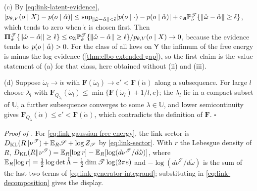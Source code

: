 (c) By \eqref{eq:link-latent-evidence},
$\lvert p_{\theta,V}(o\mid X)-p(o\mid\mathring\alpha)\rvert\leq\sup_{\lVert\mathring\omega-\mathring\alpha\rVert<\mathring\epsilon}\lvert p(o\mid\cdot)-p(o\mid\mathring\alpha)\rvert
+\mathrm c_{\mathfrak A}\mathbb P^{\mathscr T}_{\mathring\sigma}\{\lVert\mathring\omega-\mathring\alpha\rVert\geq\mathring\epsilon\}$,
which tends to zero when $\mathring\epsilon$ is chosen first. Then
$\boldsymbol\Pi^{\mathscr T}_{\mathring\sigma}\{\lVert\mathring\omega-\mathring\alpha\rVert\geq\mathring\epsilon\}\leq\mathrm c_{\mathfrak A}\mathbb P^{\mathscr T}_{\mathring\sigma}\{\lVert\mathring\omega-\mathring\alpha\rVert\geq\mathring\epsilon\}/p_{\theta,V}(o\mid X)\to0$,
because the evidence tends to $p(o\mid\mathring\alpha)>0$. For the class of all laws on $\mathsf Y$ the
infimum of the free energy is minus the log evidence (\cref{thm:elbo-extended-gap}), so the first claim is
the value statement of (a) for that class, here obtained without (ii) and (iii).

(d) Suppose $\mathring\omega_l\to\mathring\alpha$ with $\mathbf F(\mathring\omega_l)\to\mathrm c'<\mathbf F(\mathring\alpha)$ along a
subsequence. For large $l$ choose $\lambda_l$ with
$\mathbf F_{Q_{\lambda_l}}(\mathring\omega_l)\leq\min\{\mathbf F(\mathring\omega_l)+1/l,\mathrm c\}$; the $\lambda_l$ lie in a compact
subset of $\mathbb U$, a further subsequence converges to some $\lambda\in\mathbb U$, and lower semicontinuity
gives $\mathbf F_{Q_\lambda}(\mathring\alpha)\leq\mathrm c'<\mathbf F(\mathring\alpha)$, which contradicts the definition of $\mathbf F$.
\hfill$\square$

\noindent\emph{Proof of .}
For \eqref{eq:link-gaussian-free-energy}, the link sector is
$D_{\mathrm{KL}}(R\Vert\nu^{\mathscr T})+\mathbb E_R\mathscr S+\log Z_{\mathscr S}$ by \eqref{eq:link-sector}. With $r$ the
Lebesgue density of $R$,
$D_{\mathrm{KL}}(R\Vert\nu^{\mathscr T})=\mathbb E_R[\log r]-\mathbb E_R[\log(d\nu^{\mathscr T}/d\mathring\omega)]$, where
$\mathbb E_R[\log r]=\tfrac12\log\det\mathring\Lambda-\tfrac12\dim\mathscr T\log(2\pi e)$ and
$-\log(d\nu^{\mathscr T}/d\mathring\omega)$ is the sum of the last two terms of
\eqref{eq:link-generator-integrand}; substituting in \eqref{eq:link-decomposition} gives the display.

